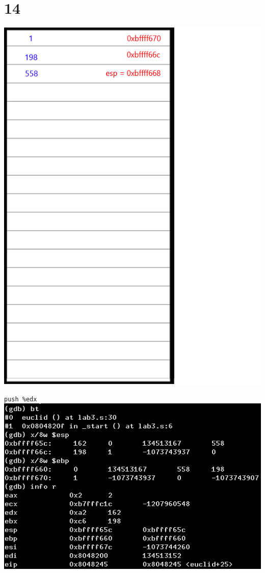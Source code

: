 \documentclass{article}
\begin{document}
\section*{14}
\begin{minipage}{5cm}
\includegraphics[scale=0.3]{s3.png}
\end{minipage}
\begin{minipage}{8cm}
\verb|push %edx|\\
\includegraphics[scale=0.4]{bxi14.png} \\
\end{minipage}
\clearpage
\end{document}
